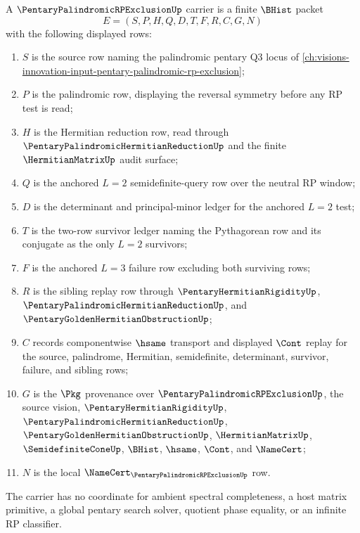 \begin{definition}
\label{def:pentary-palindromic-rp-exclusion-carrier}
A $\PentaryPalindromicRPExclusionUp$ carrier is a finite $\BHist$ packet
$$
E=(S,P,H,Q,D,T,F,R,C,G,N)
$$
with the following displayed rows:
\begin{enumerate}
\item $S$ is the source row naming the palindromic pentary Q3 locus of \autoref{ch:visions-innovation-input-pentary-palindromic-rp-exclusion};
\item $P$ is the palindromic row, displaying the reversal symmetry before any RP test is read;
\item $H$ is the Hermitian reduction row, read through $\PentaryPalindromicHermitianReductionUp$ and the finite $\HermitianMatrixUp$ audit surface;
\item $Q$ is the anchored $L=2$ semidefinite-query row over the neutral RP window;
\item $D$ is the determinant and principal-minor ledger for the anchored $L=2$ test;
\item $T$ is the two-row survivor ledger naming the Pythagorean row and its conjugate as the only $L=2$ survivors;
\item $F$ is the anchored $L=3$ failure row excluding both surviving rows;
\item $R$ is the sibling replay row through $\PentaryHermitianRigidityUp$, $\PentaryPalindromicHermitianReductionUp$, and $\PentaryGoldenHermitianObstructionUp$;
\item $C$ records componentwise $\hsame$ transport and displayed $\Cont$ replay for the source, palindrome, Hermitian, semidefinite, determinant, survivor, failure, and sibling rows;
\item $G$ is the $\Pkg$ provenance over $\PentaryPalindromicRPExclusionUp$, the source vision, $\PentaryHermitianRigidityUp$, $\PentaryPalindromicHermitianReductionUp$, $\PentaryGoldenHermitianObstructionUp$, $\HermitianMatrixUp$, $\SemidefiniteConeUp$, $\BHist$, $\hsame$, $\Cont$, and $\NameCert$;
\item $N$ is the local $\NameCert_{\PentaryPalindromicRPExclusionUp}$ row.
\end{enumerate}
The carrier has no coordinate for ambient spectral completeness, a host matrix primitive, a global pentary search solver, quotient phase equality, or an infinite RP classifier.
\end{definition}

